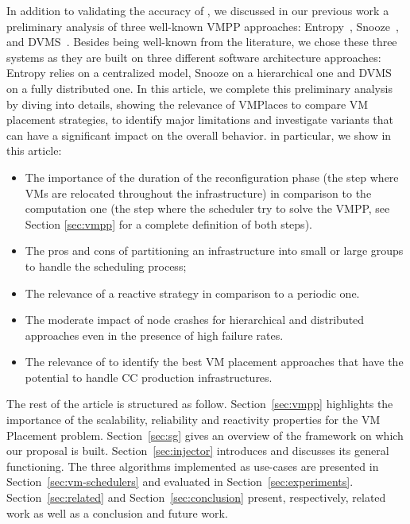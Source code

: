 In addition to validating the accuracy of \vmps, we discussed in our
previous work \cite{vmplaces:europar15} a preliminary analysis of
three well-known VMPP approaches:
Entropy~\cite{Hermenier:2009:ECM:1508293.1508300},
Snooze~\cite{feller:ccgrid12}, and DVMS~\cite{quesnel:cpe2012}.
Besides being well-known from the literature, we chose these three
systems as they are built on three different software architecture
approaches: Entropy relies on a centralized model, Snooze on a
hierarchical one and DVMS on a fully distributed one. In this article,
we complete this preliminary analysis by diving into details, showing
the relevance of VMPlaces to compare VM placement strategies, to
identify major limitations and investigate variants that can have a
significant impact on the overall behavior.  in particular, we show in
this article:
\begin{itemize}
  \item The importance of the duration of the reconfiguration phase
    (\ie the step where VMs are relocated throughout the
    infrastructure) in comparison to the computation one (\ie the step
    where the scheduler try to solve the VMPP, see Section
    \ref{sec:vmpp} for a complete definition of both steps).
  \item The pros and cons of partitioning an infrastructure into small
    or large groups to handle the scheduling process;
  \item The relevance of a reactive strategy in comparison to a
    periodic one.
  \item The moderate impact of node crashes for hierarchical and
    distributed approaches even in the presence of high failure rates.
  \item The relevance of \vmps to identify the best VM placement
    approaches that have the potential to handle CC production
    infrastructures.
\end{itemize}

The rest of the article is structured as
follow. Section~\ref{sec:vmpp} highlights the importance of the
scalability, reliability and reactivity properties for the VM
Placement problem.  Section~\ref{sec:sg} gives an overview of the \sg
framework on which our proposal is built. Section~\ref{sec:injector}
introduces \vmps and discusses its general functioning. The three
algorithms implemented as use-cases are presented in
Section~\ref{sec:vm-schedulers} and evaluated in
Section~\ref{sec:experiments}. Section~\ref{sec:related} and
Section~\ref{sec:conclusion} present, respectively, related work as
well as a conclusion and future work.

